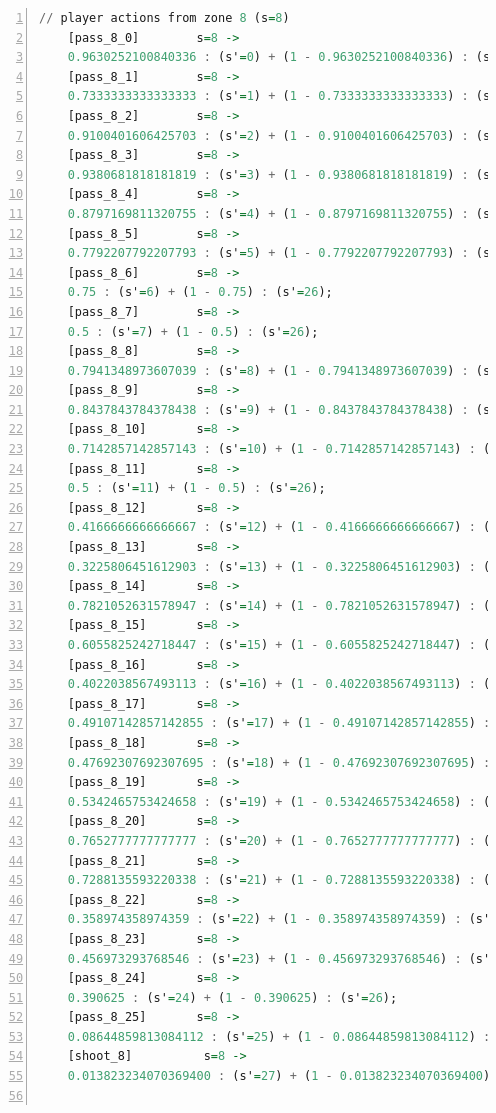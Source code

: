 \documentclass{l4proj}
\begin{document}
\begin{appendices}
\begin{lstlisting}[language=Haskell, numbers=left, caption=MDP used for strategy generation. This is the model specification as-is after the refinements at the end of chapter 3.]
	// player actions from zone 8 (s=8)
	[pass_8_0]	      s=8 ->
	0.9630252100840336 : (s'=0) + (1 - 0.9630252100840336) : (s'=26);
	[pass_8_1]	      s=8 ->
	0.7333333333333333 : (s'=1) + (1 - 0.7333333333333333) : (s'=26);
	[pass_8_2]	      s=8 ->
	0.9100401606425703 : (s'=2) + (1 - 0.9100401606425703) : (s'=26);
	[pass_8_3]	      s=8 ->
	0.9380681818181819 : (s'=3) + (1 - 0.9380681818181819) : (s'=26);
	[pass_8_4]	      s=8 ->
	0.8797169811320755 : (s'=4) + (1 - 0.8797169811320755) : (s'=26);
	[pass_8_5]	      s=8 ->
	0.7792207792207793 : (s'=5) + (1 - 0.7792207792207793) : (s'=26);
	[pass_8_6]	      s=8 ->
	0.75 : (s'=6) + (1 - 0.75) : (s'=26);
	[pass_8_7]	      s=8 ->
	0.5 : (s'=7) + (1 - 0.5) : (s'=26);
	[pass_8_8]	      s=8 ->
	0.7941348973607039 : (s'=8) + (1 - 0.7941348973607039) : (s'=26);
	[pass_8_9]	      s=8 ->
	0.8437843784378438 : (s'=9) + (1 - 0.8437843784378438) : (s'=26);
	[pass_8_10]	      s=8 ->
	0.7142857142857143 : (s'=10) + (1 - 0.7142857142857143) : (s'=26);
	[pass_8_11]	      s=8 ->
	0.5 : (s'=11) + (1 - 0.5) : (s'=26);
	[pass_8_12]	      s=8 ->
	0.4166666666666667 : (s'=12) + (1 - 0.4166666666666667) : (s'=26);
	[pass_8_13]	      s=8 ->
	0.3225806451612903 : (s'=13) + (1 - 0.3225806451612903) : (s'=26);
	[pass_8_14]	      s=8 ->
	0.7821052631578947 : (s'=14) + (1 - 0.7821052631578947) : (s'=26);
	[pass_8_15]	      s=8 ->
	0.6055825242718447 : (s'=15) + (1 - 0.6055825242718447) : (s'=26);
	[pass_8_16]	      s=8 ->
	0.4022038567493113 : (s'=16) + (1 - 0.4022038567493113) : (s'=26);
	[pass_8_17]	      s=8 ->
	0.49107142857142855 : (s'=17) + (1 - 0.49107142857142855) : (s'=26);
	[pass_8_18]	      s=8 ->
	0.47692307692307695 : (s'=18) + (1 - 0.47692307692307695) : (s'=26);
	[pass_8_19]	      s=8 ->
	0.5342465753424658 : (s'=19) + (1 - 0.5342465753424658) : (s'=26);
	[pass_8_20]	      s=8 ->
	0.7652777777777777 : (s'=20) + (1 - 0.7652777777777777) : (s'=26);
	[pass_8_21]	      s=8 ->
	0.7288135593220338 : (s'=21) + (1 - 0.7288135593220338) : (s'=26);
	[pass_8_22]	      s=8 ->
	0.358974358974359 : (s'=22) + (1 - 0.358974358974359) : (s'=26);
	[pass_8_23]	      s=8 ->
	0.456973293768546 : (s'=23) + (1 - 0.456973293768546) : (s'=26);
	[pass_8_24]	      s=8 ->
	0.390625 : (s'=24) + (1 - 0.390625) : (s'=26);
	[pass_8_25]	      s=8 ->
	0.08644859813084112 : (s'=25) + (1 - 0.08644859813084112) : (s'=26);
	[shoot_8]	       s=8 ->
	0.013823234070369400 : (s'=27) + (1 - 0.013823234070369400) : (s'=26);


\end{lstlisting}
\end{appendices}
\end{document}
